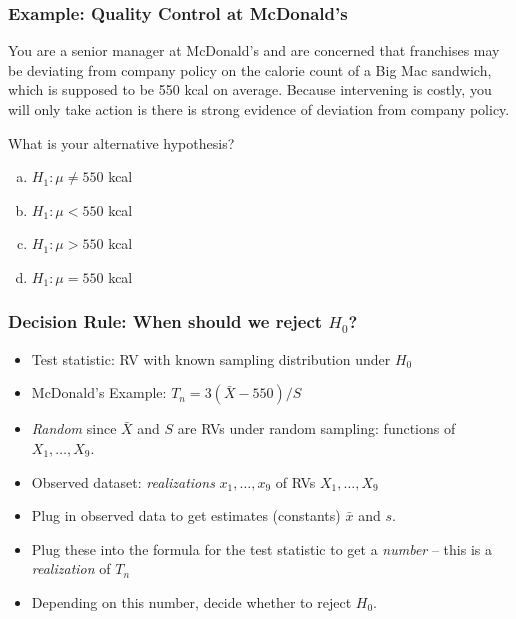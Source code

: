 \documentclass{beamer}
\begin{document}
\begin{frame}
\frametitle{Example: Quality Control at McDonald's }

You are a senior manager at McDonald's and are concerned that franchises may be deviating from company policy on the calorie count of a Big Mac sandwich, which is supposed to be 550 kcal on average. Because intervening is costly, you will only take action is there is strong evidence of deviation from company policy. \\

\vspace{1em}

\alert{What is your alternative hypothesis?}
	\begin{enumerate}[(a)]
		\item $H_1\colon \mu \neq 550$ kcal
		\item $H_1\colon \mu < 550$ kcal
		\item $H_1\colon \mu > 550$ kcal
		\item $H_1\colon \mu = 550$ kcal
\end{enumerate}
\end{frame}
\begin{frame}
	\frametitle{Decision Rule: When should we reject $H_0$?}
	\begin{itemize}
		\item Test statistic: RV with known sampling distribution under $H_0$
		\item McDonald's Example: $T_n = 3(\bar{X} - 550)/S$
		\item \emph{Random} since $\bar{X}$ and $S$ are RVs under random sampling: functions of $X_1, \hdots, X_9$.
		\item Observed dataset: \emph{realizations} $x_1, \hdots, x_9$ of RVs $X_1, \hdots, X_9$
		\item Plug in observed data to get estimates (constants) $\bar{x}$ and $s$.
		\item Plug these into the formula for the test statistic to get a \emph{number} -- this is a \emph{realization} of $T_n$ 
		\item Depending on this number, decide whether to reject $H_0$.
	\end{itemize}
\end{frame}
\end{document}
